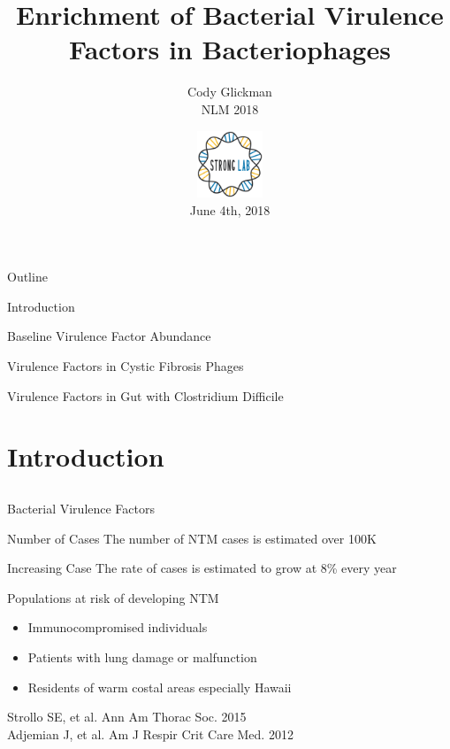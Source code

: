 \documentclass[11pt]{beamer}
\author{Cody Glickman \\ NLM 2018}
\title{Enrichment of Bacterial Virulence Factors in Bacteriophages}
\date{ \includegraphics[height=2cm, width=2cm]{lablogo.png} \\ June 4th, 2018}
\begin{document}
	\maketitle
	\begin{frame}{Outline}
	\begin{block}{Introduction}
	\end{block}
	\vspace{-0.5cm}
	\begin{block}{Baseline Virulence Factor Abundance}
	\end{block}
	\vspace{-0.5cm}
	\begin{block}{Virulence Factors in Cystic Fibrosis Phages}
	\end{block}
	\vspace{-0.5cm}
	\begin{block}{Virulence Factors in Gut with Clostridium Difficile}
	\end{block}
	\vspace{-0.5cm}
	
	\end{frame}
	
	
\section{Introduction}
\subsection{}

	\begin{frame}{Bacterial Virulence Factors}
		\begin{block}{Number of Cases}
		The number of NTM cases is estimated over 100K
		\end{block}
		
		\begin{block}{Increasing Case}
		The rate of cases is estimated to grow at 8\% every year
		\end{block}
		
		
		\begin{block}{Populations at risk of developing NTM}
		\begin{itemize}
		\item Immunocompromised individuals 
		\item Patients with lung damage or malfunction 
		\item Residents of warm costal areas especially Hawaii
		\end{itemize}
		\end{block} 
		
		\begin{block}
		
		\end{block}
	\vspace{-1cm}
	\tiny{Strollo SE, et al. Ann Am Thorac Soc. 2015 \\
	Adjemian J, et al. Am J Respir Crit Care Med. 2012}
	
	\end{frame}
	
\end{document}
